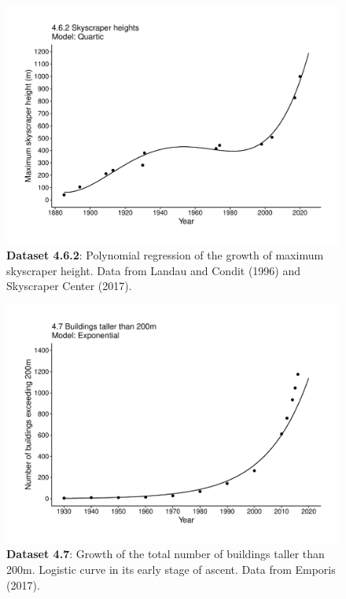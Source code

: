 \documentclass[aps,rmp,preprint,superscriptaddress,10pt,onecolumn]{article}
\begin{document}
\clearpage
\begin{figure}[h]
\includegraphics[width=\textwidth]{output/figs-ggplot/4.6.2.pdf}
\caption{\textbf{Dataset 4.6.2}: Polynomial regression of the growth of maximum skyscraper height. Data from Landau and Condit (1996) and Skyscraper Center (2017). }
\end{figure}
	
\clearpage
\begin{figure}[h]
\includegraphics[width=\textwidth]{output/figs-ggplot/4.7.pdf}
\caption{\textbf{Dataset 4.7}: Growth of the total number of buildings taller than 200m. Logistic curve in its early stage of ascent. Data from Emporis (2017).}
\end{figure}
	
\end{document}
